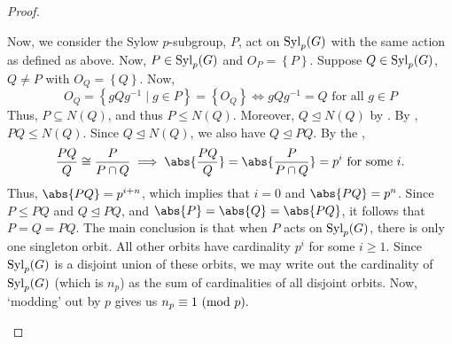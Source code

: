 \begin{proof}
\begin{enumerate}
        Now, we consider the Sylow $p$-subgroup, $P$, act on $\operatorname{Syl}_p(G)$ with the same action as defined as above. Now, $P \in \operatorname{Syl}_p(G)$ and $O_P = \left\{ P \right\}$. Suppose $Q \in \operatorname{Syl}_p(G)$, $Q \neq P$ with $O_Q = \left\{ Q \right\}$. Now, 
        \[
            O_Q = \left\{ gQg^{-1} \mid g \in P \right\} = \left\{ O_Q \right\} \iff gQg^{-1} = Q \text{ for all } g \in P
        \]
        Thus, $P \subseteq N(Q)$, and thus $P \leq N(Q)$. Moreover, $Q \trianglelefteq N(Q)$ by . By , $PQ \leq N(Q)$. Since $Q \trianglelefteq N(Q)$, we also have $Q \trianglelefteq PQ$. By the ,
        \[
            \frac{PQ}{Q} \cong \frac{P}{P \cap Q} \implies \abs{\frac{PQ}{Q}} = \abs{\frac{P}{P\cap Q}} = p^i \text{ for some } i.
        \]
        Thus, $\abs{PQ} = p^{i+n}$, which implies that $i = 0$ and $\abs{PQ} = p^n$. Since $P \leq PQ$ and $Q \trianglelefteq PQ$, and $\abs{P} = \abs{Q} = \abs{PQ}$, it follows that $P = Q = PQ$. The main conclusion is that when $P$ acts on $\operatorname{Syl}_p(G)$, there is only one singleton orbit. All other orbits have cardinality $p^i$ for some $i \geq 1$. Since $\operatorname{Syl}_p(G)$ is a disjoint union of these orbits, we may write out the cardinality of $\operatorname{Syl}_p(G)$ (which is $n_p$) as the sum of cardinalities of all disjoint orbits. Now, `modding' out by $p$ gives us $n_p \equiv 1 \ (\mathrm{mod}\ p).$ \qedhere
    \end{enumerate}
\end{proof}